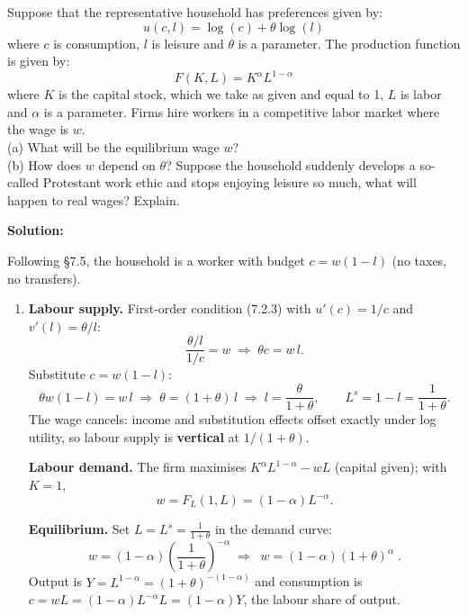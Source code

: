 \documentclass[12pt, letterpaper]{article}
\begin{document}
\begin{tcolorbox}[evenbox,title={Problem 7.6 \quad The Protestant Work Ethic}]
\begin{tcolorbox}[questionbox]
Suppose that the representative household has preferences given by:
\[u(c,l)=\log(c)+\theta\log(l)\]
where $c$ is consumption, $l$ is leisure and $\theta$ is a parameter. The production function
is given by:
\[F(K,L)=K^{\alpha}L^{1-\alpha}\]
where $K$ is the capital stock, which we take as given and equal to 1, $L$ is labor and
$\alpha$ is a parameter. Firms hire workers in a competitive labor market where the wage is
$w$.\\[3pt]
(a) What will be the equilibrium wage $w$?\\
(b) How does $w$ depend on $\theta$? Suppose the household suddenly develops a so-called
Protestant work ethic and stops enjoying leisure so much, what will happen to real wages?
Explain.
\end{tcolorbox}

\textbf{Solution:}

Following \S7.5, the household is a worker with budget $c=w(1-l)$ (no taxes, no transfers).

\begin{enumerate}
\item \textbf{Labour supply.} First-order condition (7.2.3) with $u'(c)=1/c$ and
$v'(l)=\theta/l$:
\[
\frac{\theta/l}{1/c}=w\;\Longrightarrow\;\theta c=w\,l .
\]
Substitute $c=w(1-l)$:
\[
\theta w(1-l)=w\,l\;\Longrightarrow\;\theta=(1+\theta)\,l\;\Longrightarrow\;
l=\frac{\theta}{1+\theta},\qquad L^s=1-l=\frac{1}{1+\theta}.
\]
The wage cancels: income and substitution effects offset exactly under log utility, so
labour supply is \textbf{vertical} at $1/(1+\theta)$.

\textbf{Labour demand.} The firm maximises $K^{\alpha}L^{1-\alpha}-wL$ (capital given); with
$K=1$,
\[
w=F_L(1,L)=(1-\alpha)L^{-\alpha}.
\]

\textbf{Equilibrium.} Set $L=L^s=\frac{1}{1+\theta}$ in the demand curve:
\[
w=(1-\alpha)\left(\frac{1}{1+\theta}\right)^{-\alpha}
\;\Longrightarrow\;
\boxed{\;w=(1-\alpha)(1+\theta)^{\alpha}\;}.
\]
Output is $Y=L^{1-\alpha}=(1+\theta)^{-(1-\alpha)}$ and consumption is
$c=wL=(1-\alpha)L^{-\alpha}L=(1-\alpha)Y$, the labour share of output.


\end{enumerate}
\end{tcolorbox}
\end{document}
